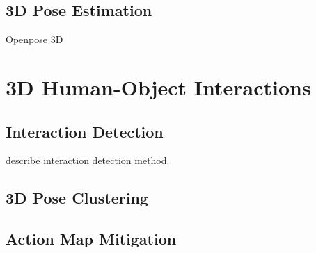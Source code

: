 \subsection{3D Pose Estimation}
Openpose 3D

\section{3D Human-Object Interactions}

\subsection{Interaction Detection}
describe interaction detection method.

\subsection{3D Pose Clustering}

\subsection{Action Map Mitigation}
